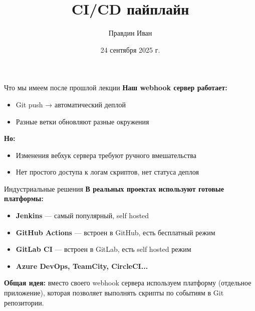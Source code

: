 \documentclass[aspectratio=169]{beamer}
\title{CI/CD пайплайн}
\author{Правдин Иван}
\date{24 сентября 2025 г.}
\begin{document}
    \maketitle

    \begin{frame}{Что мы имеем после прошлой лекции}
        \textbf{Наш webhook сервер работает:}
        
        \begin{itemize}
            \item Git push → автоматический деплой
            \item Разные ветки обновляют разные окружения
        \end{itemize}

        \textbf{Но:}

        \begin{itemize}
            \item Изменения вебхук сервера требуют ручного вмешательства
            \item Нет простого доступа к логам скриптов, нет статуса деплоя
        \end{itemize}
    \end{frame}

    \begin{frame}{Индустриальные решения}
        \textbf{В реальных проектах используют готовые платформы:}
        
        \begin{itemize}
            \item \textbf{Jenkins} — самый популярный, self hosted
            \item \textbf{GitHub Actions} — встроен в GitHub, есть бесплатный режим
            \item \textbf{GitLab CI} — встроен в GitLab, есть self hosted режим
            \item \textbf{Azure DevOps, TeamCity, CircleCI...}
        \end{itemize}
        
        \vspace{0.5cm}
        
        \textbf{Общая идея:} вместо своего webhook сервера используем платформу (отдельное приложение), которая позволяет выполнять
        скрипты по событиям в Git репозитории.
    \end{frame}
\end{document}

